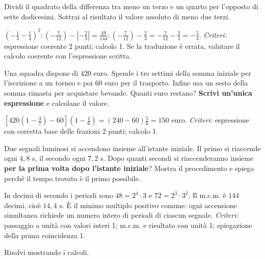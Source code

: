 \begin{esercizi}
\begin{esercizio}
Dividi il quadrato della differenza tra meno un terzo e un quarto per l'opposto di sette dodicesimi. Sottrai al risultato il valore assoluto di meno due terzi.
\begin{solution}
$\left(-\frac13-\frac14\right)^2:\left(-\frac7{12}\right)-\left|-\frac23\right|=\frac{49}{144}:(-\frac7{12})-\frac23=-\frac7{12}-\frac23=\boxed{-\frac54}$.
\textit{Criteri:} espressione coerente 2 punti; calcolo 1. Se la traduzione è errata, valutare il calcolo coerente con l'espressione scritta.
\end{solution}
\end{esercizio}

\begin{esercizio}
\question[3] Una squadra dispone di $420$ euro. Spende i tre settimi della somma iniziale per l'iscrizione a un torneo e poi $60$ euro per il trasporto. Infine usa un sesto della somma rimasta per acquistare bevande. Quanti euro restano? \textbf{Scrivi un'unica espressione} e calcolane il valore.
\begin{solution}
$\left[420(1-\frac37)-60\right](1-\frac16)=(240-60)\frac56=\boxed{150\text{ euro}}$. \textit{Criteri:} espressione con corretta base delle frazioni 2 punti; calcolo 1.
\end{solution}
\end{esercizio}

\begin{esercizio}
\question[3] Due segnali luminosi si accendono insieme all'istante iniziale. Il primo si riaccende ogni $4{,}8$ s, il secondo ogni $7{,}2$ s. Dopo quanti secondi si riaccenderanno insieme \textbf{per la prima volta dopo l'istante iniziale}? Mostra il procedimento e spiega perché il tempo trovato è il primo possibile.
\begin{solution}
In decimi di secondo i periodi sono $48=2^4\cdot3$ e $72=2^3\cdot3^2$. Il m.c.m. è $144$ decimi, cioè $\boxed{14{,}4\text{ s}}$. È il minimo multiplo positivo comune: ogni accensione simultanea richiede un numero intero di periodi di ciascun segnale. \textit{Criteri:} passaggio a unità con valori interi 1; m.c.m. e risultato con unità 1; spiegazione della prima coincidenza 1.
\end{solution}
\end{esercizio}

\begin{esercizio}
\question Risolvi mostrando i calcoli.
\begin{parts}

\end{parts}
\end{esercizio}
\end{esercizi}
